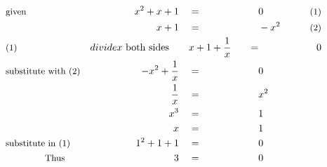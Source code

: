 \begin{alignat*}{5}
&\small\text{given}&x^2+x+1\quad&=\quad&&0\qquad&\small\text{(1)}\\
&\,&x+1\quad&=&&-x^2\qquad&\small\text{(2)}\\
&\small\text{(1)}&divide x\text{ both sides}\qquad&x+1+\frac{1}{x}\quad&=&&0\\
&\small\text{substitute with (2)}&-x^2+\frac{1}{x}\quad&=&&0\\
&\,&\frac{1}{x}\quad&=&&x^2\\
&\,&x^3\quad&=&&1\\
&\,&x\quad&=&&1\\
&\small\text{substitute in (1)}&1^2+1+1\quad&=&&0\\
&\qquad\qquad\small\text{Thus}&3\quad&=&&0
\end{alignat*}
